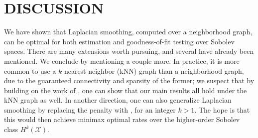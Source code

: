 \documentclass[twoside]{article}
\newcommand{\1}{\mathbf{1}}
\newcommand{\Lap}{L}
\newcommand{\Xset}{\mathcal{X}}
\theoremstyle{definition}
\theoremstyle{remark}
\begin{document}
\section{DISCUSSION}
\label{sec:discussion}

We have shown that Laplacian smoothing, computed over a neighborhood graph, can be optimal for both estimation and goodness-of-fit testing over Sobolev spaces. There are many extensions worth pursuing, and several have already been mentioned. We conclude by mentioning a couple more. In practice, it is more common to use a $k$-nearest-neighbor (kNN) graph than a neighborhood graph, due to the guaranteed connectivity and sparsity of the former; we suspect that by building on the work of \citet{calder2019}, one can show that our main results all hold under the kNN graph as well. In another direction, one can also generalize Laplacian smoothing by replacing the penalty \smash{$f^\top \Lap_{n,r} f$} with \smash{$f^\top \Lap_{n,r}^k f$}, for an integer $k > 1$. The hope is that this would then achieve minimax optimal rates over the higher-order Sobolev class $H^k(\Xset)$. %


 
\end{document}
